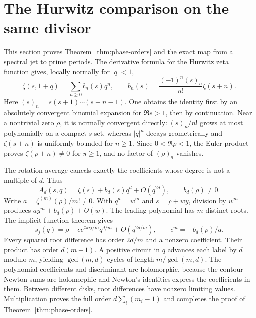 \section{The Hurwitz comparison on the same divisor}\label{sec:phase}
This section proves Theorem~\ref{thm:phase-orders} and the exact map from a spectral jet to prime periods. The derivative formula for the Hurwitz zeta function \cite[25.11.17]{dlmf} gives, locally normally for $|q|<1$,
\[
 \zeta(s,1+q)=\sum_{n\ge0}b_n(s)q^n,
 \qquad b_n(s)=\frac{(-1)^n(s)_n}{n!}\zeta(s+n).
\]
Here $(s)_n=s(s+1)\cdots(s+n-1)$. One obtains the identity first by an absolutely convergent binomial expansion for $\Re s>1$, then by continuation. Near a nontrivial zero $\rho$, it is normally convergent directly: $(s)_n/n!$ grows at most polynomially on a compact $s$-set, whereas $|q|^n$ decays geometrically and $\zeta(s+n)$ is uniformly bounded for $n\ge1$. Since $0<\Re\rho<1$, the Euler product proves $\zeta(\rho+n)\ne0$ for $n\ge1$, and no factor of $(\rho)_n$ vanishes.

The rotation average cancels exactly the coefficients whose degree is not a multiple of $d$. Thus
\[
 A_d(s,q)=\zeta(s)+b_d(s)q^d+O(q^{2d}),\qquad b_d(\rho)\ne0.
\]
Write $a=\zeta^{(m)}(\rho)/m!\ne0$. With $q^d=w^m$ and $s=\rho+wy$, division by $w^m$ produces $ay^m+b_d(\rho)+O(w)$. The leading polynomial has $m$ distinct roots. The implicit function theorem gives
\[
 s_j(q)=\rho+c e^{2\pi ij/m}q^{d/m}+O(q^{2d/m}),
 \qquad c^m=-b_d(\rho)/a.
\]
Every squared root difference has order $2d/m$ and a nonzero coefficient. Their product has order $d(m-1)$. A positive circuit in $q$ advances each label by $d$ modulo $m$, yielding $\gcd(m,d)$ cycles of length $m/\gcd(m,d)$. The polynomial coefficients and discriminant are holomorphic, because the contour Newton sums are holomorphic and Newton's identities express the coefficients in them. Between different disks, root differences have nonzero limiting values. Multiplication proves the full order $d\sum_i(m_i-1)$ and completes the proof of Theorem~\ref{thm:phase-orders}.

